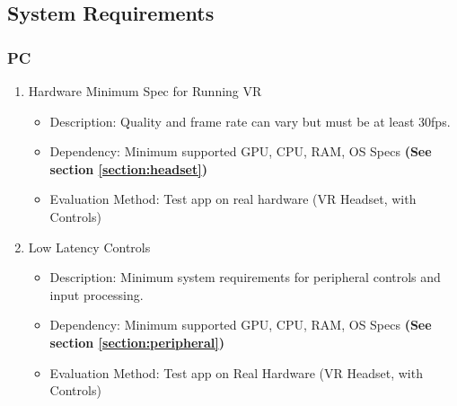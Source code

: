 \documentclass[a4paper,10pt]{article}
\begin{document}
	\subsection{System Requirements}
	\subsubsection{PC}
		\begin{enumerate}
			\item Hardware Minimum Spec for Running VR
			\begin{itemize}
				\item Description: Quality and frame rate can vary but must be at least 30fps.
				\item Dependency: Minimum supported GPU, CPU, RAM, OS Specs \textbf{(See section \ref{section:headset})}
				\item Evaluation Method: Test app on real hardware (VR Headset, with Controls)
			\end{itemize}
			\item Low Latency Controls
			\begin{itemize}
				\item Description: Minimum system requirements for peripheral controls and input processing.
				\item Dependency: Minimum supported GPU, CPU, RAM, OS Specs \textbf{(See section \ref{section:peripheral})}
				\item Evaluation Method: Test app on Real Hardware (VR Headset, with Controls)
			\end{itemize}
		\end{enumerate}
	
\end{document}
